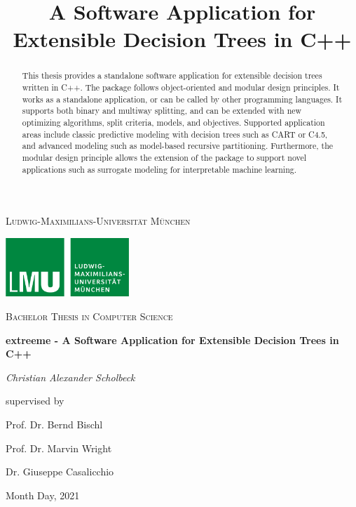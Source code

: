 \documentclass[a4paper, 11pt]{article}
\begin{document}
\title{A Software Application for Extensible Decision Trees in C++}

\begin{titlepage}
	\centering
	\vspace{1cm}
	{\scshape\LARGE Ludwig-Maximilians-Universität München \par}
	\vspace{1.5cm}
	\includegraphics[width=0.35\textwidth]{figure/lmu_logo.png}\par\vspace{1cm}
	\vspace{0.5cm}
	{\scshape\Large Bachelor Thesis in Computer Science\par}
	\vspace{1.5cm}
	{\huge\bfseries extreeme - A Software Application for Extensible Decision Trees in C++\par}
	\vspace{2cm}
	{\Large\itshape Christian Alexander Scholbeck\par}
	\vfill
	supervised by\par
	Prof. Dr. Bernd Bischl \par
	Prof. Dr. Marvin Wright \par
	Dr. Giuseppe Casalicchio

	\vfill

	{\large Month Day, 2021 \par}
\end{titlepage}

\newpage
\thispagestyle{empty}

\begin{abstract}
This thesis provides a standalone software application for extensible decision trees written in C++. The package follows object-oriented and modular design principles. It works as a standalone application, or can be called by other programming languages. It supports both binary and multiway splitting, and can be extended with new optimizing algorithms, split criteria, models, and objectives. Supported application areas include classic predictive modeling with decision trees such as CART or C4.5, and advanced modeling such as model-based recursive partitioning. Furthermore, the modular design principle allows the extension of the package to support novel applications such as surrogate modeling for interpretable machine learning.
\end{abstract}
\vspace*{1cm}
\tableofcontents
\clearpage
\setcounter{page}{1}
\end{document}
